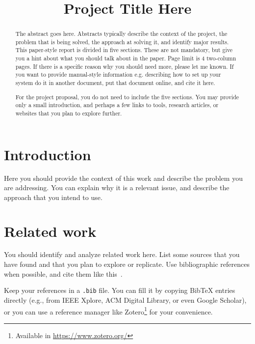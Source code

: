 \documentclass[conference, a4paper, 10pt]{IEEEtran}
\begin{document}
\title{Project Title Here}

\author{
\and
{}
\and
{}
}
\maketitle

\begin{abstract}
The abstract goes here. Abstracts typically describe the context of the project, the problem that is being solved, the approach at solving it, and identify major results.  This paper-style report is divided in five sections. These are not mandatory, but give you a hint about what you should talk about in the paper. Page limit is 4 two-column pages. If there is a specific reason why you should need more, please let me known. If you want to provide manual-style information e.g. describing how to set up your system do it in another document, put that document online, and cite it here.

For the project proposal, you do not need to include the five sections. You may provide only a small introduction, and perhaps a few links to tools, research articles, or websites that you plan to explore further. 

\end{abstract}

\section{Introduction}
Here you should provide the context of this work and describe the problem you are addressing. You can explain why it is a relevant issue, and describe the approach that you intend to use.

\section{Related work}
You should identify and analyze related work here. List some sources that you have found and that you plan to explore or replicate. Use bibliographic references when possible, and cite them like this~\cite{ArfaouiPrivacy2019}.

Keep your references in a \texttt{.bib} file. You can fill it by copying BibTeX entries directly (e.g., from IEEE Xplore, ACM Digital Library, or even Google Scholar), or you can use a reference manager like Zotero\footnote{Available in \url{https://www.zotero.org/}} for your convenience.
\end{document}
